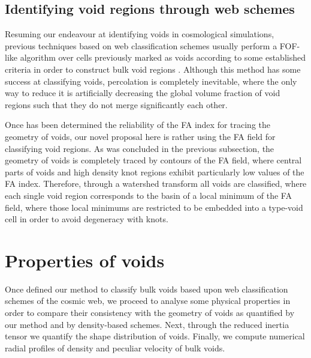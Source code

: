 \documentclass[a4,useAMS,usenatbib,usegraphicx]{latex/mn2e}
\begin{document}
\subsection{Identifying void regions through web schemes}
\label{subsec:identification}


Resuming our endeavour at identifying voids in cosmological simulations, 
previous techniques based on web classification schemes usually perform a 
FOF-like algorithm over cells previously marked as voids according to some 
established criteria in order to construct bulk void regions 
\SRKED{[references]}. Although this method has some success at classifying 
voids, percolation is completely inevitable, where the only way to reduce 
it is artificially decreasing the global volume fraction of void regions 
such that they do not merge significantly each other. 


Once has been determined the reliability of the FA index for tracing 
the geometry of voids, our novel proposal here is rather using the FA 
field for classifying void regions. As was concluded in the previous 
subsection, the geometry of voids is completely traced by contours of the
FA field, where central parts of voids and high density knot regions 
exhibit particularly low values of the FA index. Therefore, through a 
watershed transform all voids are classified, where each single void 
region corresponds to the basin of a local minimum of the FA field, where
those local minimums are restricted to be embedded into a type-void cell
in order to avoid degeneracy with knots.




\section{Properties of voids}
\label{sec:properties}


Once defined our method to classify bulk voids based upon web 
classification schemes of the cosmic web, we proceed to analyse some 
physical properties in order to compare their consistency with the 
geometry of voids as quantified by our method and by density-based schemes.
Next, through the reduced inertia tensor we quantify the shape distribution 
of voids. Finally, we compute numerical radial profiles of density and 
peculiar velocity of bulk voids.
\end{document}
